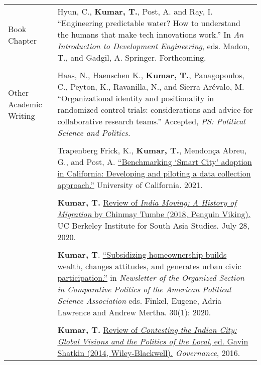 \documentclass[letterpaper, 10pt]{article}
\begin{document}
\begin{longtable}{p{1in}p{5.5in}}
{{Book Chapter}} 
& Hyun, C., \textbf{Kumar, T.}, Post, A. and Ray, I. ``Engineering predictable water? How to understand the humans that make tech innovations work.'' In \textit{An Introduction to Development Engineering}, eds. Madon, T., and Gadgil, A. Springer. Forthcoming.\\

& \\

{{Other Academic Writing}} 

& Haas, N., Haenschen K., \textbf{Kumar, T.}, Panagopoulos, C., Peyton, K., Ravanilla, N., and Sierra-Ar\'{e}valo, M.  ``Organizational identity and positionality in randomized control trials: considerations and advice for collaborative research teams.'' Accepted, \textit{PS: Political Science and Politics.} \\
& \\

& Trapenberg Frick, K., \textbf{Kumar, T.}, Mendon\c{c}a Abreu, G., and Post, A. \href{https://escholarship.org/uc/item/3797p0ws}{``Benchmarking `Smart City' adoption in California: Developing and piloting a data collection approach.''} University of California. 2021. \\
& \\
& \textbf{Kumar, T.} \href{https://southasia.berkeley.edu/sites/default/files/shared/India_Center/India_Moving.pdf}{Review of \textit{India Moving: A History of Migration} by Chinmay Tumbe (2018, Penguin Viking).}  UC Berkeley Institute for South Asia Studies. July 28, 2020.\\
& \\

& \textbf{Kumar, T}.
 \href{https://www.comparativepoliticsnewsletter.org/wp-content/uploads/2020/05/Spring-Newsletter-2020.pdf}{``Subsidizing homeownership builds wealth, changes attitudes, and generates urban civic participation.''} in \textit{Newsletter of the Organized Section in Comparative Politics of the American Political Science Association} eds. Finkel, Eugene, Adria Lawrence and Andrew Mertha. 30(1): 2020. \\
&\\
& \textbf{Kumar, T.} \href{http://onlinelibrary.wiley.com/doi/10.1111/gove.12241/abstract}{Review of \textit{Contesting the Indian City: Global Visions and the Politics of the Local}, ed. Gavin Shatkin (2014, Wiley-Blackwell).} \textit{Governance}, 2016. 

\\


\end{longtable}
\end{document}
